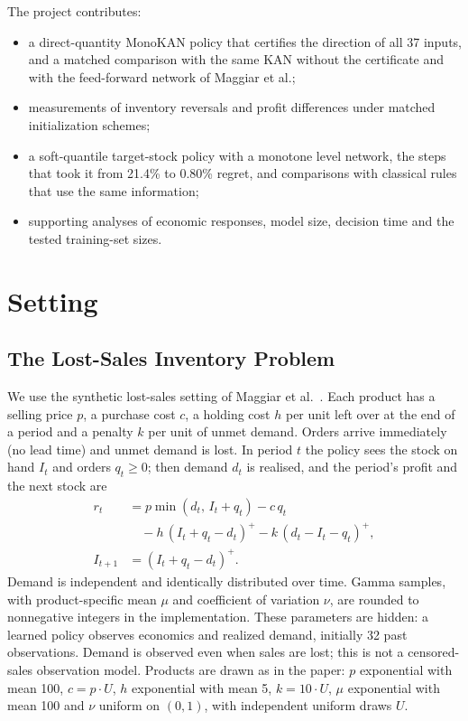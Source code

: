 \documentclass[conference]{IEEEtran}
\begin{document}
The project contributes:
\begin{itemize}
\item a direct-quantity MonoKAN policy that certifies the direction of all 37 inputs, and a matched comparison with
the same KAN without the certificate and with the feed-forward network of Maggiar et al.;
\item measurements of inventory reversals and profit differences under matched initialization schemes;
\item a soft-quantile target-stock policy with a monotone level network, the steps that took it from
21.4\% to 0.80\% regret, and comparisons with classical rules that use the
same information;
\item supporting analyses of economic responses, model size, decision time and the tested training-set sizes.
\end{itemize}

\section{Setting}\label{sec:setting}
\subsection{The Lost-Sales Inventory Problem}\label{sec:problem}
We use the synthetic lost-sales setting of Maggiar et al.~\cite{maggiar2025}. Each product has a selling price $p$, a
purchase cost $c$, a holding cost $h$ per unit left over at the end of a period and a penalty $k$ per unit of unmet
demand. Orders arrive immediately (no lead time) and unmet demand is lost. In period $t$ the policy sees the stock on
hand $I_t$ and orders $q_t \geq 0$; then demand $d_t$ is realised, and the period's profit and the next stock are
\begin{equation}
\begin{aligned}
r_t &= p\min(d_t,\, I_t + q_t) - c\,q_t \\
&\quad - h\,(I_t + q_t - d_t)^+ - k\,(d_t - I_t - q_t)^+,\\
I_{t+1} &= (I_t + q_t - d_t)^+.
\end{aligned}
\label{eq:dynamics}
\end{equation}
Demand is independent and identically distributed over time. Gamma samples, with product-specific mean $\mu$ and
coefficient of variation $\nu$, are rounded to nonnegative integers in the implementation. These parameters are hidden:
a learned policy observes economics and realized demand, initially 32 past observations. Demand is observed even when
sales are lost; this is not a censored-sales observation model. Products are drawn as in the
paper: $p$ exponential with mean 100, $c = p \cdot U$, $h$ exponential with mean 5, $k = 10 \cdot U$, $\mu$ exponential
with mean 100 and $\nu$ uniform on $(0, 1)$, with independent uniform draws $U$.
\end{document}
